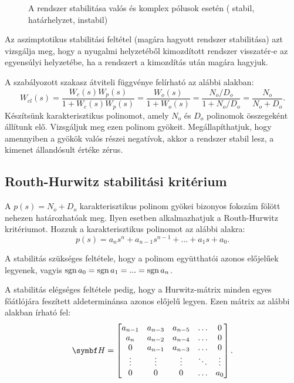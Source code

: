 \begin{figure}[htb]
  \centering
  
  \caption{
    A rendszer stabilitása valós és komplex pólusok esetén
    ({\color{darkBlue} stabil},
    {\color{darkYellow} határhelyzet},
    {\color{darkRed} instabil})
  }
  \label{fig:asymptotic-poles}
\end{figure}
Az aszimptotikus stabilitási feltétel (magára hagyott rendszer stabilitása)
azt vizsgálja meg, hogy a nyugalmi helyzetéből kimozdított rendszer visszatér-e
az egyensúlyi helyzetébe, ha a rendszert a kimozdítás után magára hagyjuk.

A szabályozott szakasz átviteli függvénye felírható az alábbi alakban:
\begin{equation}
  W_{cl}(s)
  = \frac{W_c(s) W_p(s)}{1 + W_c(s) W_p(s)}
  = \frac{W_o(s)}{1 + W_o(s)}
  = \frac{N_o / D_o}{1 + N_o / D_o}
  = \frac{N_o}{N_o + D_o}
  .
  \label{eq:asymptotic-cl}
\end{equation}
Készítsünk karakterisztikus polinomot, amely $N_o$ és $D_o$ polinomok
összegeként állítunk elő. Vizsgáljuk meg ezen polinom gyökeit. Megállapíthatjuk,
hogy amennyiben a gyökök valós részei negatívok, akkor a rendszer stabil lesz,
a kimenet állandósult értéke zérus.

\subsection{Routh-Hurwitz stabilitási kritérium}

A $p(s) = N_o + D_o$ karakterisztikus polinom gyökei bizonyos fokszám fölött
nehezen határozhatóak meg. Ilyen esetben alkalmazhatjuk a Routh-Hurwitz
kritériumot. Hozzuk a karakterisztikus polinomot az alábbi alakra:
\begin{equation}
  p(s) = a_n s^n + a_{n-1} s^{n-1} + \dots + a_1 s + a_0.
  \label{eq:RH-poles}
\end{equation}

A stabilitás szükséges feltétele, hogy a polinom együtthatói azonos előjelűek
legyenek, vagyis $\operatorname{sgn} a_0 = \operatorname{sgn} a_1 = ... = \operatorname{sgn} a_n$.

A stabilitás elégséges feltétele pedig, hogy a Hurwitz-mátrix minden egyes
főátlójára feszített aldeterminánsa azonos előjelű legyen. Ezen mátrix az
alábbi alakban írható fel:
\begin{equation}
  \rmat H = \begin{bmatrix}
    a_{n-1} & a_{n-3} & a_{n-5} & \hdots & 0      \\
    a_{n}   & a_{n-2} & a_{n-4} & \hdots & 0      \\
    0       & a_{n-1} & a_{n-3} & \hdots & 0      \\
    \vdots  & \vdots  & \vdots  & \ddots & \vdots \\
    0       & 0       & 0       & \hdots & a_0    \\
  \end{bmatrix}
  .
  \label{eq:RH-matrix}
\end{equation}

